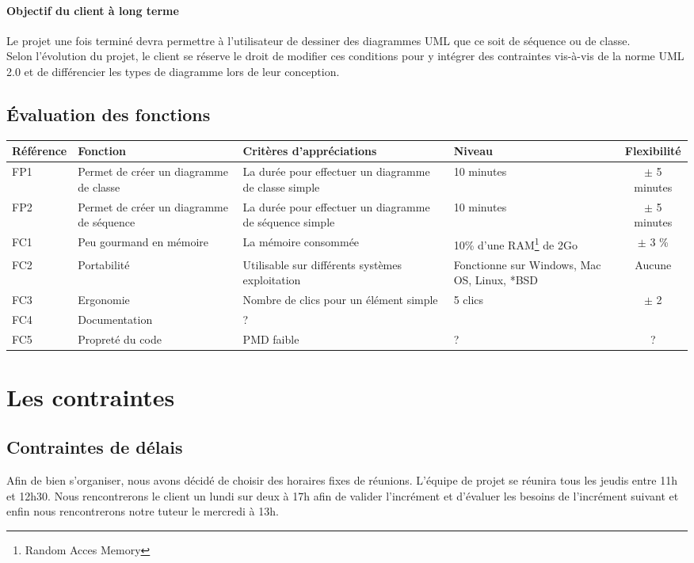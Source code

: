 \documentclass[12pt,a4paper,openany]{article}
\begin{document}
	\paragraph{Objectif du client à long terme}
	Le projet une fois terminé devra permettre à l'utilisateur de dessiner des diagrammes UML que ce soit de séquence ou de classe.\\
	Selon l'évolution du projet, le client se réserve le droit de modifier ces conditions pour y
	intégrer des contraintes vis-à-vis de la norme UML 2.0 et de différencier les types de diagramme lors de leur conception. 
	
	\subsection{Évaluation des fonctions}
	\begin{tabular}{|p{2cm}|p{3cm}|p{5cm}|p{3cm}|c|}
		\hline
		\textbf{Référence}& \textbf{Fonction} & \textbf{Critères d'appréciations} & \textbf{Niveau} & \textbf{Flexibilité} \\
		\hline
			FP1 & Permet de créer un diagramme de classe & La durée pour effectuer un diagramme de classe simple & 10 minutes & $\pm$ 5 minutes\\
		\hline
			FP2 & Permet de créer un diagramme de séquence & La durée pour effectuer un diagramme de séquence simple & 10 minutes & $\pm$ 5 minutes\\
		\hline
			FC1 & Peu gourmand en mémoire & La mémoire consommée & 10\% d'une RAM\footnote{Random Acces Memory} de 2Go & $\pm$ 3 \%\\
		\hline
			FC2 & Portabilité & Utilisable sur différents systèmes exploitation & Fonctionne sur Windows, Mac OS, Linux, *BSD & Aucune \\
		\hline
			FC3 & Ergonomie & Nombre de clics pour un élément simple & 5 clics & $\pm$ 2\\
		\hline
			FC4 & Documentation & ? & &\\ 
		\hline
			FC5 & Propreté du code & PMD faible & ? & ?\\ 
		\hline
	\end{tabular}
	\section{Les contraintes}
	\subsection{Contraintes de délais}
	Afin de bien s'organiser, nous avons décidé de choisir des horaires fixes de réunions. L'équipe de projet se réunira tous
	les jeudis entre 11h et 12h30. Nous rencontrerons le client un lundi sur deux à 17h afin de valider l'incrément et d'évaluer les
	besoins de l'incrément suivant et enfin nous rencontrerons notre 
	tuteur le mercredi à 13h.\\

\end{document}
